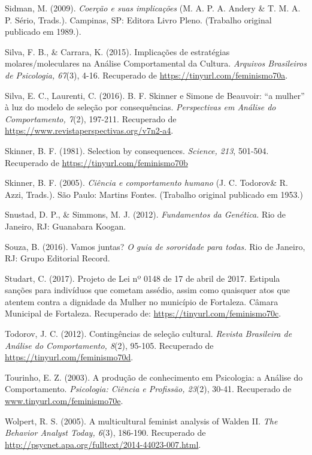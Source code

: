 \hangindent=25pt
\noindent Sidman, M. (2009). \textit{Coerção e suas implicações} (M. A. P. A. Andery \& T. M. A. P. Sério, Trads.). Campinas, SP: Editora Livro Pleno. (Trabalho original publicado em 1989.).

\hangindent=25pt
\noindent Silva, F. B., \& Carrara, K. (2015). Implicações de estratégias molares/moleculares na Análise Comportamental da Cultura. \textit{Arquivos Brasileiros de Psicologia, 67}(3), 4-16. Recuperado de \url{https://tinyurl.com/feminismo70a}.

\hangindent=25pt
\noindent Silva, E. C., Laurenti, C. (2016). B. F. Skinner e Simone de Beauvoir: “a mulher” à luz do modelo de seleção por consequências. \textit{Perspectivas em Análise do Comportamento, 7}(2), 197-211. Recuperado de \url{https://www.revistaperspectivas.org/v7n2-a4}.

\hangindent=25pt
\noindent Skinner, B. F. (1981). Selection by consequences. \textit{Science, 213}, 501-504. Recuperado de \url{https://tinyurl.com/feminismo70b}

\hangindent=25pt
\noindent Skinner, B. F. (2005). \textit{Ciência e comportamento humano} (J. C. Todorov\& R. Azzi, Trads.). São Paulo: Martins Fontes. (Trabalho original publicado em 1953.)

\hangindent=25pt
\noindent Snustad, D. P., \& Simmons, M. J. (2012). \textit{Fundamentos da Genética.} Rio de Janeiro, RJ: Guanabara Koogan.

\hangindent=25pt
\noindent Souza, B. (2016). Vamos juntas? \textit{O guia de sororidade para todas.} Rio de Janeiro, RJ: Grupo Editorial Record. 

\hangindent=25pt
\noindent Studart, C. (2017). Projeto de Lei nº 0148 de 17 de abril de 2017. Estipula sanções para indivíduos que cometam assédio, assim como quaisquer atos que atentem contra a dignidade da Mulher no município de Fortaleza. Câmara Municipal de Fortaleza. Recuperado de: \url{https://tinyurl.com/feminismo70c}.

\hangindent=25pt
\noindent Todorov, J. C. (2012). Contingências de seleção cultural. \textit{Revista Brasileira de Análise do Comportamento, 8}(2), 95-105. Recuperado de \url{https://tinyurl.com/feminismo70d}.

\hangindent=25pt
\noindent Tourinho, E. Z. (2003). A produção de conhecimento em Psicologia: a Análise do Comportamento. \textit{Psicologia: Ciência e Profissão, 23}(2), 30-41. Recuperado de \url{www.tinyurl.com/feminismo70e}.

\hangindent=25pt
\noindent Wolpert, R. S. (2005). A multicultural feminist analysis of Walden II. \textit{The Behavior Analyst Today, 6}(3), 186-190. Recuperado de \url{http://psycnet.apa.org/fulltext/2014-44023-007.html}.